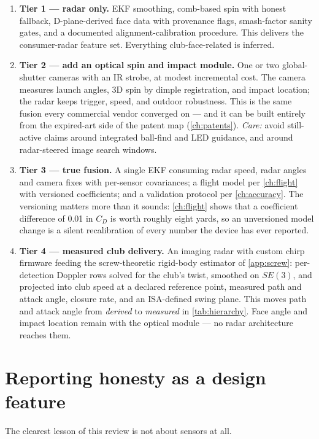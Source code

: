 \begin{enumerate}
\item \textbf{Tier 1 --- radar only.} EKF smoothing, comb-based spin with
honest fallback, D-plane-derived face data with provenance flags,
smash-factor sanity gates, and a documented alignment-calibration procedure.
This delivers the consumer-radar feature set. Everything club-face-related
is inferred.
\item \textbf{Tier 2 --- add an optical spin and impact module.} One or two
global-shutter cameras with an IR strobe, at modest incremental cost. The
camera measures launch angles, 3D spin by dimple registration, and impact
location; the radar keeps trigger, speed, and outdoor robustness. This is
the same fusion every commercial vendor converged on --- and it can be built
entirely from the expired-art side of the patent map (\cref{ch:patents}).
\emph{Care:} avoid still-active claims around integrated ball-find and LED
guidance, and around radar-steered image search windows.
\item \textbf{Tier 3 --- true fusion.} A single EKF consuming radar speed,
radar angles and camera fixes with per-sensor covariances; a flight model
per \cref{ch:flight} with versioned coefficients; and a validation protocol
per \cref{ch:accuracy}. The versioning matters more than it sounds:
\cref{ch:flight} shows that a coefficient difference of 0.01 in $C_D$ is
worth roughly eight yards, so an unversioned model change is a silent
recalibration of every number the device has ever reported.
\item \textbf{Tier 4 --- measured club delivery.} An imaging radar with
custom chirp firmware feeding the screw-theoretic rigid-body estimator of
\cref{app:screw}: per-detection Doppler rows solved for the club's twist,
smoothed on $SE(3)$, and projected into club speed at a declared reference
point, measured path and attack angle, closure rate, and an ISA-defined
swing plane. This moves path and attack angle from \emph{derived} to
\emph{measured} in \cref{tab:hierarchy}. Face angle and impact location
remain with the optical module --- no radar architecture reaches them.
\end{enumerate}

\section{Reporting honesty as a design feature}

The clearest lesson of this review is not about sensors at all.

